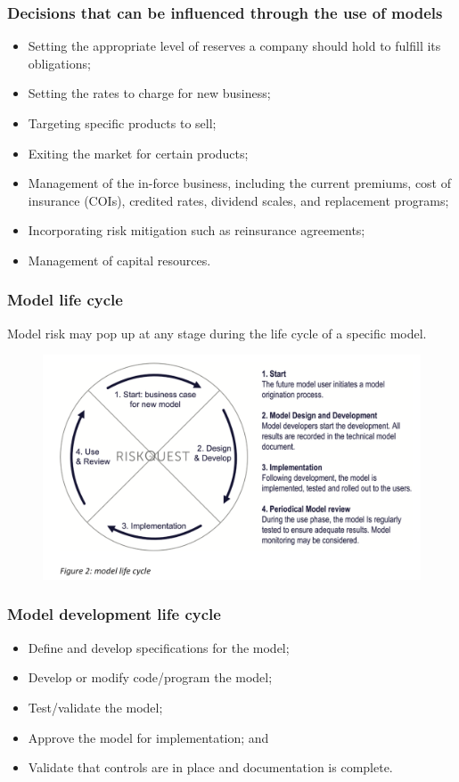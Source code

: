 \documentclass[11pt]{beamer}
\begin{document}
\begin{frame}
\frametitle{Decisions that can be influenced through the use of models}
\begin{itemize}
	\item Setting the appropriate level of reserves a company should hold to fulfill its obligations;
	\item Setting the rates to charge for new business;
	\item Targeting specific products to sell;
	\item Exiting the market for certain products;
	\item Management of the in-force business, including the current premiums, cost of insurance (COIs), credited rates, dividend scales, and replacement programs;
	\item Incorporating risk mitigation such as reinsurance agreements;
	\item Management of capital resources.
\end{itemize}
\end{frame}


\begin{frame}
\frametitle{Model life cycle}
Model risk may pop up at any stage during the life cycle of a specific model.
\begin{figure}[h]
	\centering
	\includegraphics[scale=.3]{images/model_lifecycle}
\end{figure}
\end{frame}


\begin{frame}
\frametitle{Model development life cycle}
\begin{itemize}
	\item Define and develop specifications for the model;
	\item Develop or modify code/program the model;
	\item Test/validate the model;
	\item Approve the model for implementation; and
	\item Validate that controls are in place and documentation is complete.
\end{itemize}
\end{frame}
\end{document}
